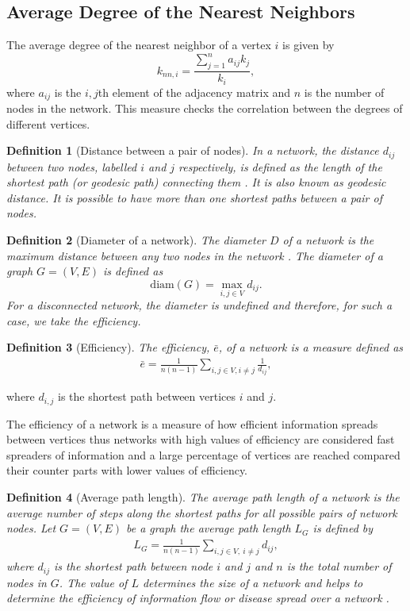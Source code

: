 \documentclass[10pt,a4paper]{article}
\newtheorem{defn}{Definition}
\begin{document}
\subsection{Average Degree of the Nearest Neighbors}
The average degree of the nearest neighbor of a vertex $i$ is given by
\begin{equation}
k_{nn,i} = \frac{\sum_{j=1}^{n} a_{ij} k_j}{k_i},
\end{equation}
where $a_{ij}$ is the $i,j$th element of the adjacency matrix and $n$ is the number of nodes in the network.
This measure checks the correlation between the degrees of different vertices.

\begin{defn}[Distance between a pair of nodes]
	In a network, the distance $d_{ij}$ between two nodes, labelled $i$ and $j$ respectively, is defined as the length of the shortest path (or geodesic path) connecting them \citep{wang2003complex}. It is also known as geodesic distance. It is possible to have more than one shortest paths between a pair of nodes.
\end{defn}
\begin{defn}[Diameter of a network]
	The diameter $D$ of a network is the maximum distance between any two
	nodes in the network \citep{wang2003complex}. The diameter of a graph $G= (V,E )$ is defined as \[ \text{diam}(G ) = \max_{i,j \in V} d_{ij}.\] For a disconnected network, the diameter is undefined and therefore, for such a case, we take the efficiency.
\end{defn}	

\begin{defn}[Efficiency]
	The efficiency, $\bar{e}$, of a network is a measure defined as
	\begin{eqnarray*}
		\bar{e} =\frac{1}{n(n-1)} \sum_{i,j \in V,i\neq j} \frac{1}{d_{ij}},
		\label{eqn:eff}
	\end{eqnarray*}
\end{defn}
where $d_{i,j}$ is the shortest path between vertices $i$ and $j$.

The efficiency of a network is a measure of how efficient information spreads between vertices thus networks with high values of efficiency are considered fast spreaders of information and a large percentage of vertices are reached compared their counter parts with lower values of efficiency.

\begin{defn}[Average path length]
	The average path length of a network is the average number of steps along the shortest paths for all possible pairs of network nodes. Let $G = (V , E )$ be a graph the average path length $L_G$ is defined by
	\begin{eqnarray}
	L_G = \frac{1}{n(n-1)} \sum_{i,j \in V,~i \neq j} d_{ij},
	\end{eqnarray}
	where $d_{ij}$ is the shortest path between node $i$ and $j$ and $n$ is the total number of nodes in $G$. The value of $L$ determines the size of a network and helps to determine the efficiency of information flow or disease spread over a network \citep{wang2003complex}.
\end{defn}
\end{document}
